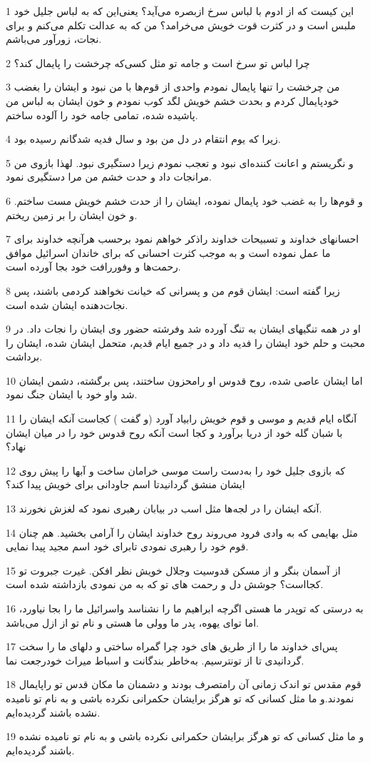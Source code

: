 \par 1 این کیست که از ادوم با لباس سرخ ازبصره می‌آید؟ یعنی‌این که به لباس جلیل خود ملبس است و در کثرت قوت خویش می‌خرامد؟ من که به عدالت تکلم می‌کنم و برای نجات، زورآور می‌باشم.
\par 2 چرا لباس تو سرخ است و جامه تو مثل کسی‌که چرخشت را پایمال کند؟
\par 3 من چرخشت را تنها پایمال نمودم واحدی از قوم‌ها با من نبود و ایشان را بغضب خودپایمال کردم و بحدت خشم خویش لگد کوب نمودم و خون ایشان به لباس من پاشیده شده، تمامی جامه خود را آلوده ساختم.
\par 4 زیرا که یوم انتقام در دل من بود و سال فدیه شدگانم رسیده بود.
\par 5 و نگریستم و اعانت کننده‌ای نبود و تعجب نمودم زیرا دستگیری نبود. لهذا بازوی من مرانجات داد و حدت خشم من مرا دستگیری نمود.
\par 6 و قوم‌ها را به غضب خود پایمال نموده، ایشان را از حدت خشم خویش مست ساختم. و خون ایشان را بر زمین ریختم.
\par 7 احسانهای خداوند و تسبیحات خداوند راذکر خواهم نمود برحسب هر‌آنچه خداوند برای ما عمل نموده است و به موجب کثرت احسانی که برای خاندان اسرائیل موافق رحمت‌ها و وفوررافت خود بجا آورده است.
\par 8 زیرا گفته است: ایشان قوم من و پسرانی که خیانت نخواهند کردمی باشند، پس نجات‌دهنده ایشان شده است.
\par 9 او در همه تنگیهای ایشان به تنگ آورده شد وفرشته حضور وی ایشان را نجات داد. در محبت و حلم خود ایشان را فدیه داد و در جمیع ایام قدیم، متحمل ایشان شده، ایشان را برداشت.
\par 10 اما ایشان عاصی شده، روح قدوس او رامحزون ساختند، پس برگشته، دشمن ایشان شد واو خود با ایشان جنگ نمود.
\par 11 آنگاه ایام قدیم و موسی و قوم خویش رابیاد آورد (و گفت ) کجاست آنکه ایشان را با شبان گله خود از دریا برآورد و کجا است آنکه روح قدوس خود را در میان ایشان نهاد؟
\par 12 که بازوی جلیل خود را به‌دست راست موسی خرامان ساخت و آبها را پیش روی ایشان منشق گردانیدتا اسم جاودانی برای خویش پیدا کند؟
\par 13 آنکه ایشان را در لجه‌ها مثل اسب در بیابان رهبری نمود که لغزش نخورند.
\par 14 مثل بهایمی که به وادی فرود می‌روند روح خداوند ایشان را آرامی بخشید. هم چنان قوم خود را رهبری نمودی تابرای خود اسم مجید پیدا نمایی.
\par 15 از آسمان بنگر و از مسکن قدوسیت وجلال خویش نظر افکن. غیرت جبروت تو کجااست؟ جوشش دل و رحمت های تو که به من نمودی بازداشته شده است.
\par 16 به درستی که توپدر ما هستی اگر‌چه ابراهیم ما را نشناسد واسرائیل ما را بجا نیاورد، اما تو‌ای یهوه، پدر ما وولی ما هستی و نام تو از ازل می‌باشد.
\par 17 پس‌ای خداوند ما را از طریق های خود چرا گمراه ساختی و دلهای ما را سخت گردانیدی تا از تونترسیم. به‌خاطر بندگانت و اسباط میراث خودرجعت نما.
\par 18 قوم مقدس تو اندک زمانی آن رامتصرف بودند و دشمنان ما مکان قدس تو راپایمال نمودند.و ما مثل کسانی که تو هرگز برایشان حکمرانی نکرده باشی و به نام تو نامیده نشده باشند گردیده‌ایم.
\par 19 و ما مثل کسانی که تو هرگز برایشان حکمرانی نکرده باشی و به نام تو نامیده نشده باشند گردیده‌ایم.
 
